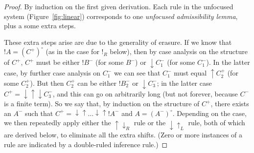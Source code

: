 \begin{proof}
  By induction on the first given derivation. Each rule in the
  unfocused system (Figure~\ref{fig:linear}) corresponds to one {\it
    unfocused admissibility lemma}, plus a some extra steps.

  These extra steps arise are due to the generality of erasure. If we
  know that ${!}A = (C^+)^\circ$ (as in the case for ${!}_R$ below),
  then by case analysis on the structure of $C^+$, $C^+$ must be
  either ${!}B^-$ (for some $B^-$) or ${\downarrow}C_1^-$ (for some
  $C_1^-$). In the latter case, by further case analysis on $C_1^-$ we
  can see that $C_1^-$ must equal ${\uparrow}C_2^+$ (for some
  $C_2^+$). But then $C_2^+$ can be either ${!}B_2^-$ or
  ${\downarrow}C_3^-$; in the latter case $C^+ =
  {\downarrow}{\uparrow}{\downarrow}C_3^-$, and this can go on
  arbitrarily long (but not forever, because $C^-$ is a finite
  term). So we say that, by induction on the structure of $C^+$, there
  exists an $A^-$ such that $C^+ =
  {\downarrow}{\uparrow}\ldots{\downarrow}{\uparrow}{!}A^-$ and $A =
  (A^-)^\circ$. Depending on the case, we then repeatedly apply either
  the ${\uparrow}{\downarrow}_R$ rule or the ${\downarrow}{\uparrow}_L$
  rule,
  both of which are derived below, to eliminate all the extra shifts.
  (Zero or more instances of a rule are indicated by a double-ruled
  inference rule.)


\end{proof}
